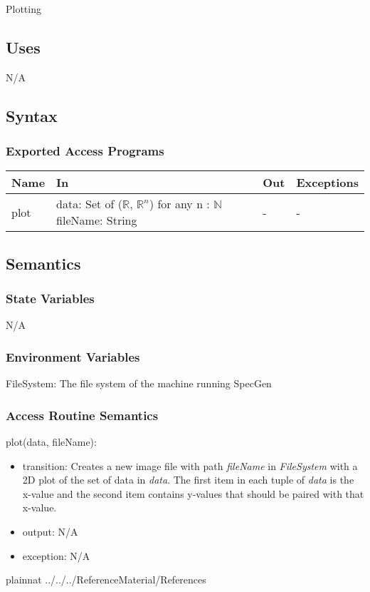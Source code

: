 \documentclass[12pt, titlepage]{article}
\newcommand{\progname}{SpecGen}
\begin{document}
Plotting

\subsection{Uses}

N/A

\subsection{Syntax}

\subsubsection{Exported Access Programs}

\begin{center}
\begin{tabular}{p{2cm} p{4cm} p{3cm} p{3cm}}
\hline
\textbf{Name} & \textbf{In} & \textbf{Out} & \textbf{Exceptions} \\
\hline
plot & data: Set of ($\mathbb{R}$, $\mathbb{R}^n$) 
  \newline \hspace*{1em}for any n : $\mathbb{N}$
  \newline fileName: String & - & - \\
\hline
\end{tabular}
\end{center}

\subsection{Semantics}

\subsubsection{State Variables}
N/A

\subsubsection{Environment Variables}
FileSystem: The file system of the machine running \progname

\subsubsection{Access Routine Semantics}

\noindent plot(data, fileName):
\begin{itemize}
\item transition: Creates a new image file with path \emph{fileName} in 
  \emph{FileSystem} with a 2D plot of the set of data in \emph{data}.  The 
  first item in each tuple of \emph{data} is the x-value and the second item 
  contains y-values that should be paired with that x-value.    
\item output: N/A
\item exception: N/A
\end{itemize}

\newpage


 {plainnat}
 {../../../ReferenceMaterial/References}
\end{document}
